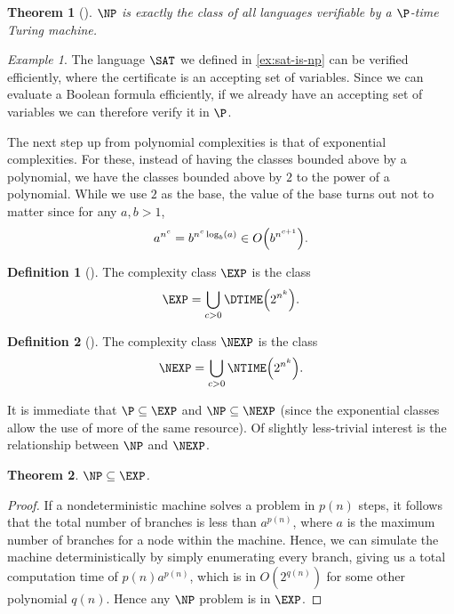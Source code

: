 \documentclass[english]{reedthesis}
\theoremstyle{plain}
\newtheorem{thm}{Theorem}[section]
\theoremstyle{definition}
\newtheorem{defn}[defn]{Definition}
\theoremstyle{remark}
\newtheorem{example}{Example}[thm]
\begin{document}
\begin{thm}[{\cite[Def.\ 7.19]{Sip97}}]\label{thm:np-verifier}
  $\NP$ is exactly the class of all languages verifiable by a $\P$-time Turing
  machine.
\end{thm}


\begin{example}\label{ex:sat-np-verifier}
  The language $\SAT$ we defined in \cref{ex:sat-is-np} can be verified
  efficiently, where the certificate is an accepting set of variables. Since we
  can evaluate a Boolean formula efficiently, if we already have an accepting
  set of variables we can therefore verify it in $\P$.
\end{example}

The next step up from polynomial complexities is that of exponential
complexities. For these, instead of having the classes bounded above by a
polynomial, we have the classes bounded above by $2$ to the power of a
polynomial. While we use $2$ as the base, the value of the base turns out not to
matter since for any $a, b > 1$,
\begin{equation}
  a^{n^{c}} = b^{n^{c}\log_{b}(a)} \in O\mleft(b^{n^{c+1}}\mright).
\end{equation}

\begin{defn}[{\cite[.2]{AB09}}]\label{def:exp}
  The complexity class $\EXP$ is the class
  \[
    \EXP = \bigcup_{c > 0}\DTIME\mleft(2^{n^{k}}\mright).
  \]
\end{defn}

\begin{defn}[{\cite[.2]{AB09}}]\label{def:nexp}
  The complexity class $\NEXP$ is the class
  \[
    \NEXP = \bigcup_{c > 0}\NTIME\mleft(2^{n^{k}}\mright).
  \]
\end{defn}

It is immediate that $\P \subseteq \EXP$ and $\NP \subseteq \NEXP$ (since the exponential
classes allow the use of more of the same resource). Of slightly less-trivial
interest is the relationship between $\NP$ and $\NEXP$.

\begin{thm}\label{thm:np-exp}
  $\NP \subseteq \EXP$.
\end{thm}

\begin{proof}
  If a nondeterministic machine solves a problem in $p(n)$ steps, it follows
  that the total number of branches is less than $a^{p(n)}$, where $a$ is the
  maximum number of branches for a node within the machine. Hence, we can
  simulate the machine deterministically by simply enumerating every branch,
  giving us a total computation time of $p(n)a^{p(n)}$, which is in
  $O(2^{q(n)})$ for some other polynomial $q(n)$. Hence any $\NP$ problem is in
  $\EXP$.
\end{proof}
\end{document}
